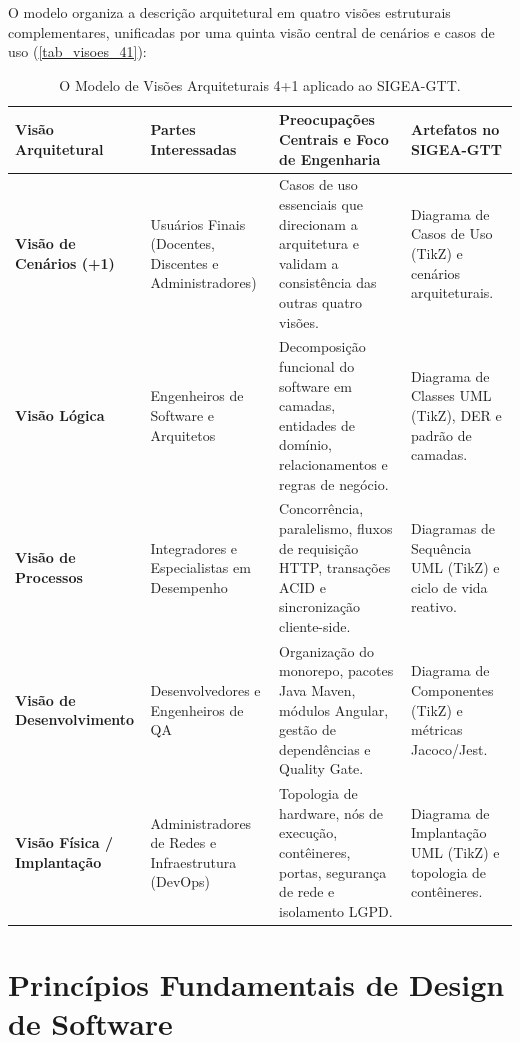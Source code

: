 O modelo organiza a descrição arquitetural em quatro visões estruturais complementares, unificadas por uma quinta visão central de cenários e casos de uso (\autoref{tab_visoes_41}):

\begin{table}[htb]
\centering
\small
\caption{O Modelo de Visões Arquiteturais 4+1 aplicado ao SIGEA-GTT.}
\label{tab_visoes_41}
\begin{tabularx}{\textwidth}{l p{3.2cm} X p{3.2cm}}
\toprule
\textbf{Visão Arquitetural} & \textbf{Partes Interessadas} & \textbf{Preocupações Centrais e Foco de Engenharia} & \textbf{Artefatos no SIGEA-GTT} \\
\midrule
\textbf{Visão de Cenários (+1)} & Usuários Finais (Docentes, Discentes e Administradores) & Casos de uso essenciais que direcionam a arquitetura e validam a consistência das outras quatro visões. & Diagrama de Casos de Uso (TikZ) e cenários arquiteturais. \\
\midrule
\textbf{Visão Lógica} & Engenheiros de Software e Arquitetos & Decomposição funcional do software em camadas, entidades de domínio, relacionamentos e regras de negócio. & Diagrama de Classes UML (TikZ), DER e padrão de camadas. \\
\midrule
\textbf{Visão de Processos} & Integradores e Especialistas em Desempenho & Concorrência, paralelismo, fluxos de requisição HTTP, transações ACID e sincronização cliente-side. & Diagramas de Sequência UML (TikZ) e ciclo de vida reativo. \\
\midrule
\textbf{Visão de Desenvolvimento} & Desenvolvedores e Engenheiros de QA & Organização do monorepo, pacotes Java Maven, módulos Angular, gestão de dependências e Quality Gate. & Diagrama de Componentes (TikZ) e métricas Jacoco/Jest. \\
\midrule
\textbf{Visão Física / Implantação} & Administradores de Redes e Infraestrutura (DevOps) & Topologia de hardware, nós de execução, contêineres, portas, segurança de rede e isolamento LGPD. & Diagrama de Implantação UML (TikZ) e topologia de contêineres. \\
\bottomrule
\end{tabularx}
\end{table}

\section{Princípios Fundamentais de Design de Software}
\label{sec_principios_design}

